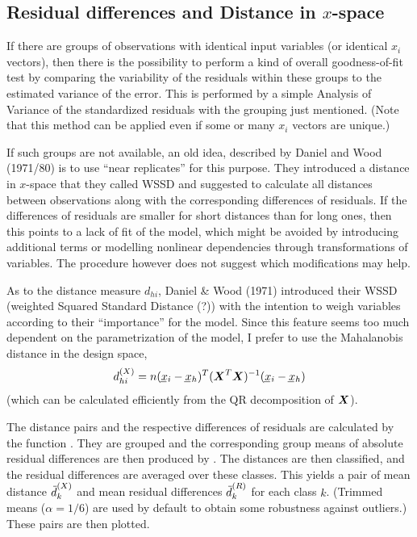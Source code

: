 \documentclass[11pt]{article}\usepackage[]{graphicx}\usepackage[]{color}
\begin{document}
\subsection{Residual differences and Distance in $x$-space}
If there are groups of observations with identical input variables
(or identical $x_i$ vectors), then there is the possibility to perform a kind
of overall goodness-of-fit test by comparing the variability of the
residuals within these groups to the estimated variance of the error.
This is performed by a simple Analysis of Variance of the standardized 
residuals with the grouping just mentioned. 
(Note that this method can be applied even if some or many $x_i$ vectors 
are unique.)

If such groups are not available, an old idea, described by
Daniel and Wood (1971/80) is to use ``near replicates'' for this purpose. 
They introduced a distance in $x$-space that they called WSSD and suggested
to calculate all distances between observations along with the
corresponding differences of residuals. If the differences of residuals
are smaller for short distances than for long ones, then this points to a
lack of fit of the model, which might be avoided by introducing 
additional terms or modelling nonlinear dependencies through
transformations of variables. The procedure however does not suggest
which modifications may help.

As to the distance measure $d_{hi}$, %
Daniel \& Wood (1971) introduced their 
WSSD (weighted Squared Standard Distance (?))
with the intention to weigh variables according to their ``importance'' for
the model. Since this feature seems too much dependent on the
parametrization of the model, I prefer to use the Mahalanobis distance in
the design space, 
$$
  d\sups X_{hi} = n(\vc x_i-\vc x_h)^T (\mx X^T\mx X)^{-1} (\vc x_i-\vc x_h)
$$
(which can be calculated efficiently from the QR decomposition of $\mx X$).

The distance pairs and the respective differences of residuals are
calculated by the function \Hneed{40mm}
. They are grouped and the
corresponding group means of absolute residual differences are then
produced by . 
The distances are then classified, and the residual differences
are averaged over these classes. This yields a pair of mean distance 
$\wb d\sups X_k$ and mean residual differences $\wb d\sups R_k$ 
for each class $k$. 
(Trimmed means ($\alpha=1/6$) are used by default to obtain some
robustness against outliers.)
These pairs are then plotted.
\end{document}
